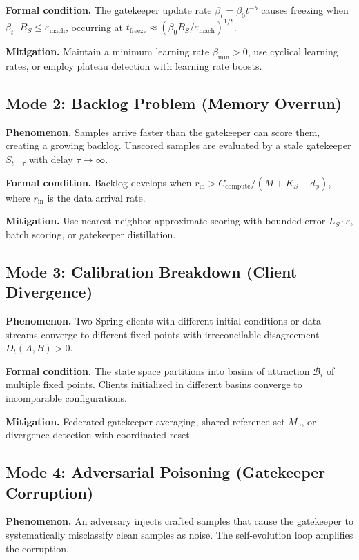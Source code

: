 \documentclass[11pt,a4paper]{article}
\theoremstyle{plain}
\theoremstyle{definition}
\theoremstyle{remark}
\begin{document}
\textbf{Formal condition.} The gatekeeper update rate $\beta_t = \beta_0 t^{-b}$ causes freezing when $\beta_t \cdot B_S \leq \varepsilon_{\text{mach}}$, occurring at $t_{\text{freeze}} \approx (\beta_0 B_S / \varepsilon_{\text{mach}})^{1/b}$.

\textbf{Mitigation.} Maintain a minimum learning rate $\beta_{\min} > 0$, use cyclical learning rates, or employ plateau detection with learning rate boosts.

\subsection{Mode 2: Backlog Problem (Memory Overrun)}

\textbf{Phenomenon.} Samples arrive faster than the gatekeeper can score them, creating a growing backlog. Unscored samples are evaluated by a stale gatekeeper $S_{t-\tau}$ with delay $\tau \to \infty$.

\textbf{Formal condition.} Backlog develops when $r_{\text{in}} > C_{\text{compute}} / (M + K_S + d_\phi)$, where $r_{\text{in}}$ is the data arrival rate.

\textbf{Mitigation.} Use nearest-neighbor approximate scoring with bounded error $L_S \cdot \varepsilon$, batch scoring, or gatekeeper distillation.

\subsection{Mode 3: Calibration Breakdown (Client Divergence)}

\textbf{Phenomenon.} Two Spring clients with different initial conditions or data streams converge to different fixed points with irreconcilable disagreement $D_t(A, B) > 0$.

\textbf{Formal condition.} The state space partitions into basins of attraction $\mathcal{B}_i$ of multiple fixed points. Clients initialized in different basins converge to incomparable configurations.

\textbf{Mitigation.} Federated gatekeeper averaging, shared reference set $M_0$, or divergence detection with coordinated reset.

\subsection{Mode 4: Adversarial Poisoning (Gatekeeper Corruption)}

\textbf{Phenomenon.} An adversary injects crafted samples that cause the gatekeeper to systematically misclassify clean samples as noise. The self-evolution loop amplifies the corruption.
\end{document}
